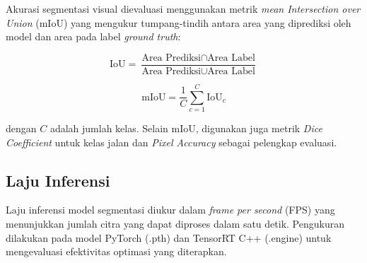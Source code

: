 Akurasi segmentasi visual dievaluasi menggunakan metrik \emph{mean Intersection over Union} (mIoU) yang mengukur tumpang-tindih antara area yang diprediksi oleh model dan area pada label \emph{ground truth}:

\begin{equation}
\text{IoU} = \frac{\text{Area Prediksi} \cap \text{Area Label}}{\text{Area Prediksi} \cup \text{Area Label}}
\label{eq:iou}
\end{equation}

\begin{equation}
\text{mIoU} = \frac{1}{C}\sum_{c=1}^{C} \text{IoU}_c
\label{eq:miou}
\end{equation}

dengan $C$ adalah jumlah kelas. Selain mIoU, digunakan juga metrik \emph{Dice Coefficient} untuk kelas jalan dan \emph{Pixel Accuracy} sebagai pelengkap evaluasi.

\subsection{Laju Inferensi}

Laju inferensi model segmentasi diukur dalam \emph{frame per second} (FPS) yang menunjukkan jumlah citra yang dapat diproses dalam satu detik.
Pengukuran dilakukan pada model PyTorch (.pth) dan TensorRT C++ (.engine) untuk mengevaluasi efektivitas optimasi yang diterapkan.
